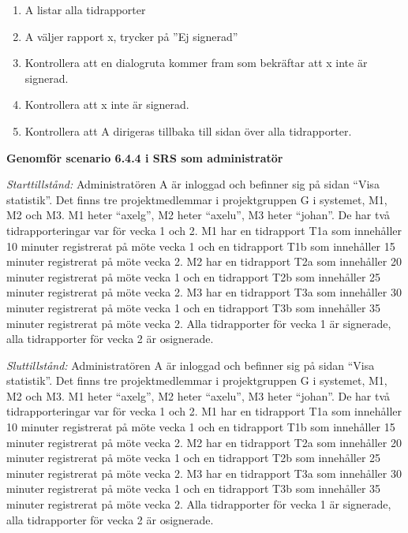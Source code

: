 \documentclass[a4paper]{article}
\begin{document}
\begin{ST}
\begin{enumerate}
\item A listar alla tidrapporter
\item A väljer rapport x, trycker på ''Ej signerad''
\item Kontrollera att en dialogruta kommer fram som bekräftar att x inte är signerad.
\item Kontrollera att x inte är signerad.
\item Kontrollera att A dirigeras tillbaka till sidan över alla tidrapporter.
\end{enumerate}

\item
\textbf{Genomför scenario 6.4.4 i SRS som administratör}

\emph{Starttillstånd:} Administratören A är inloggad och befinner sig på sidan ``Visa statistik''. Det finns tre projektmedlemmar i projektgruppen G i systemet, M1, M2 och M3. M1 heter ``axelg'', M2 heter ``axelu'', M3 heter ``johan''. De har två tidrapporteringar var för vecka 1 och 2. M1 har en tidrapport T1a som innehåller 10 minuter registrerat på möte vecka 1 och en tidrapport T1b som innehåller 15 minuter registrerat på möte vecka 2. M2 har en tidrapport T2a som innehåller 20 minuter registrerat på möte vecka 1 och en tidrapport T2b som innehåller 25 minuter registrerat på möte vecka 2. M3 har en tidrapport T3a som innehåller 30 minuter registrerat på möte vecka 1 och en tidrapport T3b som innehåller 35 minuter registrerat på möte vecka 2. Alla tidrapporter för vecka 1 är signerade, alla tidrapporter för vecka 2 är osignerade.

\emph{Sluttillstånd:} Administratören A är inloggad och befinner sig på sidan ``Visa statistik''. Det finns tre projektmedlemmar i projektgruppen G i systemet, M1, M2 och M3. M1 heter ``axelg'', M2 heter ``axelu'', M3 heter ``johan''. De har två tidrapporteringar var för vecka 1 och 2. M1 har en tidrapport T1a som innehåller 10 minuter registrerat på möte vecka 1 och en tidrapport T1b som innehåller 15 minuter registrerat på möte vecka 2. M2 har en tidrapport T2a som innehåller 20 minuter registrerat på möte vecka 1 och en tidrapport T2b som innehåller 25 minuter registrerat på möte vecka 2. M3 har en tidrapport T3a som innehåller 30 minuter registrerat på möte vecka 1 och en tidrapport T3b som innehåller 35 minuter registrerat på möte vecka 2. Alla tidrapporter för vecka 1 är signerade, alla tidrapporter för vecka 2 är osignerade.


\end{ST}
\end{document}
